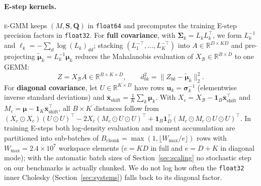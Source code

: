 \documentclass[10pt]{article} %
\newcommand{\egmm}{\textsc{e-GMM}}
\newcommand{\R}{\mathbb{R}}
\begin{document}
\paragraph{E-step kernels.} \egmm{} keeps $(M, \mathbf{S}, \mathbf{Q})$ in \texttt{float64} and precomputes the training E-step precision factors in \texttt{float32}. For \textbf{full covariance}, with $\boldsymbol{\Sigma}_k = L_k L_k^\top$, we form $L_k^{-1}$ and $\ell_k = -\sum_{d} \log (L_k)_{dd}$; stacking $(L_1^{-\top}, \dots, L_K^{-\top})$ into $A \in \R^{D \times KD}$ and pre-projecting $\tilde{\boldsymbol{\mu}}_k = L_k^{-1} \boldsymbol{\mu}_k$ reduces the Mahalanobis evaluation of $X_{\mathcal{B}} \in \R^{B \times D}$ to one GEMM:
\begin{equation}
Z = X_{\mathcal{B}} A \in \R^{B \times K \times D}, \qquad
d^2_{bk} = \bigl\|Z_{bk} - \tilde{\boldsymbol{\mu}}_k\bigr\|_2^2.
\label{eq:full_maha}
\end{equation}
For \textbf{diagonal covariance}, let $U \in \R^{K \times D}$ have rows $\mathbf{u}_k = \boldsymbol{\sigma}_k^{-1}$ (elementwise inverse standard deviations) and $\bar{\mathbf{x}}_{\mathrm{shift}} = \frac{1}{K}\sum_k \boldsymbol{\mu}_k$. With $X_c = X_{\mathcal{B}} - \mathbf{1}_B \bar{\mathbf{x}}_{\mathrm{shift}}^\top$ and $M_c = \boldsymbol{\mu} - \mathbf{1}_K \bar{\mathbf{x}}_{\mathrm{shift}}^\top$, all $B \times K$ distances follow from $(X_c \odot X_c)(U \odot U)^\top - 2 X_c (M_c \odot U \odot U)^\top + \mathbf{1}_B \mathbf{1}_D^\top (M_c \odot M_c \odot U \odot U)^\top$. In training E-steps both log-density evaluation and moment accumulation are partitioned into sub-batches of $B_{\mathrm{chunk}} = \max(1, \lfloor W_{\max} / e \rfloor)$ rows with $W_{\max} = 2.4 \times 10^7$ workspace elements ($e = KD$ in full and $e = D + K$ in diagonal mode); with the automatic batch sizes of Section~\ref{sec:scaling} no stochastic step on our benchmarks is actually chunked. We do not log how often the \texttt{float32} inner Cholesky (Section~\ref{sec:systems}) falls back to its diagonal factor.
\end{document}
